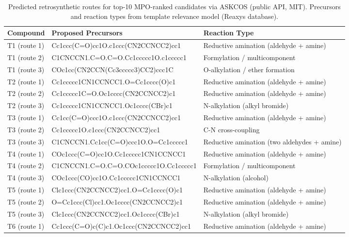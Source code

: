 
\begin{table}[htbp]
\centering
\caption{Predicted retrosynthetic routes for top-10 MPO-ranked candidates via ASKCOS (public API, MIT). Precursors and reaction types from template relevance model (Reaxys database).
\label{tab:sm_s20_retrosynthesis}}
\small
\begin{tabular}{l l l}
\toprule
Compound & Proposed Precursors & Reaction Type \\
\midrule
T1 (route 1) & Cc1ccc(C=O)cc1O.c1ccc(CN2CCNCC2)cc1 & Reductive amination (aldehyde + amine) \\
T1 (route 2) & C1CNCCN1.C=O.C=O.Cc1ccccc1O.c1ccccc1 & Formylation / multicomponent \\
T1 (route 3) & COc1cc(CN2CCN(Cc3ccccc3)CC2)ccc1C & O-alkylation / ether formation \\
T2 (route 1) & Cc1ccccc1CN1CCNCC1.O=Cc1cccc(O)c1 & Reductive amination (aldehyde + amine) \\
T2 (route 2) & Cc1ccccc1C=O.Oc1cccc(CN2CCNCC2)c1 & Reductive amination (aldehyde + amine) \\
T2 (route 3) & Cc1ccccc1CN1CCNCC1.Oc1cccc(CBr)c1 & N-alkylation (alkyl bromide) \\
T3 (route 1) & Cc1cc(C=O)ccc1O.c1ccc(CN2CCNCC2)cc1 & Reductive amination (aldehyde + amine) \\
T3 (route 2) & Cc1ccccc1O.c1ccc(CN2CCNCC2)cc1 & C-N cross-coupling \\
T3 (route 3) & C1CNCCN1.Cc1cc(C=O)ccc1O.O=Cc1ccccc1 & Reductive amination (two aldehydes + amine) \\
T4 (route 1) & COc1ccc(C=O)cc1O.Cc1ccccc1CN1CCNCC1 & Reductive amination (aldehyde + amine) \\
T4 (route 2) & C1CNCCN1.C=O.C=O.COc1ccccc1O.Cc1ccccc1 & Formylation / multicomponent \\
T4 (route 3) & COc1ccc(CO)cc1O.Cc1ccccc1CN1CCNCC1 & N-alkylation (alcohol) \\
T5 (route 1) & Clc1ccc(CN2CCNCC2)cc1.O=Cc1cccc(O)c1 & Reductive amination (aldehyde + amine) \\
T5 (route 2) & O=Cc1ccc(Cl)cc1.Oc1cccc(CN2CCNCC2)c1 & Reductive amination (aldehyde + amine) \\
T5 (route 3) & Clc1ccc(CN2CCNCC2)cc1.Oc1cccc(CBr)c1 & N-alkylation (alkyl bromide) \\
T6 (route 1) & Cc1ccc(C=O)c(C)c1.Oc1ccc(CN2CCNCC2)cc1 & Reductive amination (aldehyde + amine) \\

\end{tabular}
\end{table}
